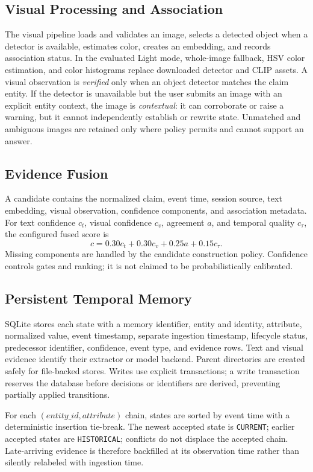 \documentclass[conference]{IEEEtran}
\begin{document}
\subsection{Visual Processing and Association}
The visual pipeline loads and validates an image, selects a detected object when a detector is available, estimates color, creates an embedding, and records association status. In the evaluated Light mode, whole-image fallback, HSV color estimation, and color histograms replace downloaded detector and CLIP assets. A visual observation is \emph{verified} only when an object detector matches the claim entity. If the detector is unavailable but the user submits an image with an explicit entity context, the image is \emph{contextual}: it can corroborate or raise a warning, but it cannot independently establish or rewrite state. Unmatched and ambiguous images are retained only where policy permits and cannot support an answer.

\subsection{Evidence Fusion}
A candidate contains the normalized claim, event time, session source, text embedding, visual observation, confidence components, and association metadata. For text confidence $c_t$, visual confidence $c_v$, agreement $a$, and temporal quality $c_\tau$, the configured fused score is
\begin{equation}
 c = 0.30c_t + 0.30c_v + 0.25a + 0.15c_\tau.
\end{equation}
Missing components are handled by the candidate construction policy. Confidence controls gates and ranking; it is not claimed to be probabilistically calibrated.

\subsection{Persistent Temporal Memory}
SQLite stores each state with a memory identifier, entity and identity, attribute, normalized value, event timestamp, separate ingestion timestamp, lifecycle status, predecessor identifier, confidence, event type, and evidence rows. Text and visual evidence identify their extractor or model backend. Parent directories are created safely for file-backed stores. Writes use explicit transactions; a write transaction reserves the database before decisions or identifiers are derived, preventing partially applied transitions.

For each $(entity\_id, attribute)$ chain, states are sorted by event time with a deterministic insertion tie-break. The newest accepted state is \texttt{CURRENT}; earlier accepted states are \texttt{HISTORICAL}; conflicts do not displace the accepted chain. Late-arriving evidence is therefore backfilled at its observation time rather than silently relabeled with ingestion time.
\end{document}
